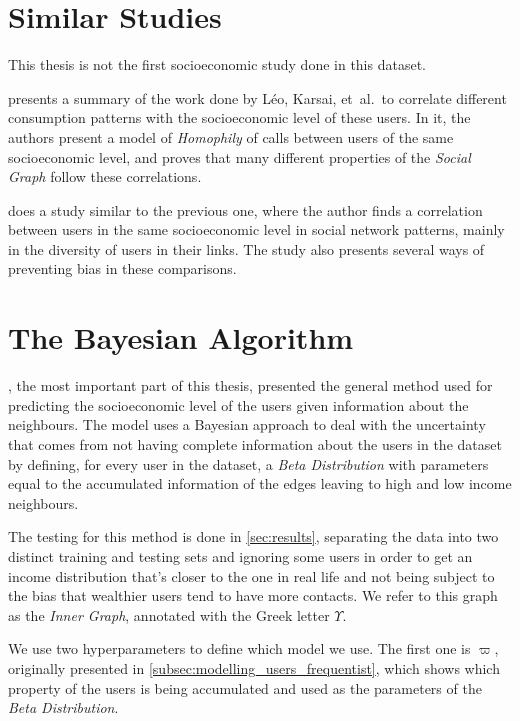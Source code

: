 
\section{Similar Studies}

This thesis is not the first socioeconomic study done in this dataset.

 presents a summary of the work done by Léo, Karsai, et~al.\ to correlate different consumption patterns with the socioeconomic level of these users.
In it, the authors present a model of \emph{Homophily} of calls between users of the same socioeconomic level, and proves that many different properties of the \emph{Social Graph} follow these correlations.

 does a study similar to the previous one, where the author finds a correlation between users in the same socioeconomic level in social network patterns, mainly in the diversity of users in their links.
The study also presents several ways of preventing bias in these comparisons.

\section{The Bayesian Algorithm}

, the most important part of this thesis, presented the general method used for predicting the socioeconomic level of the users given information about the neighbours.
The model uses a Bayesian approach to deal with the uncertainty that comes from not having complete information about the users in the dataset by defining, for every user in the dataset, a \emph{Beta Distribution} with parameters equal to the accumulated information of the edges leaving to high and low income neighbours.

The testing for this method is done in \cref{sec:results}, separating the data into two distinct training and testing sets and ignoring some users in order to get an income distribution that's closer to the one in real life and not being subject to the bias that wealthier users tend to have more contacts.
We refer to this graph as the \emph{Inner Graph}, annotated with the Greek letter $\Upsilon$.

We use two hyperparameters to define which model we use. The first one is $\varpi$, originally presented in \cref{subsec:modelling_users_frequentist}, which shows which property of the users is being accumulated and used as the parameters of the \emph{Beta Distribution}.

